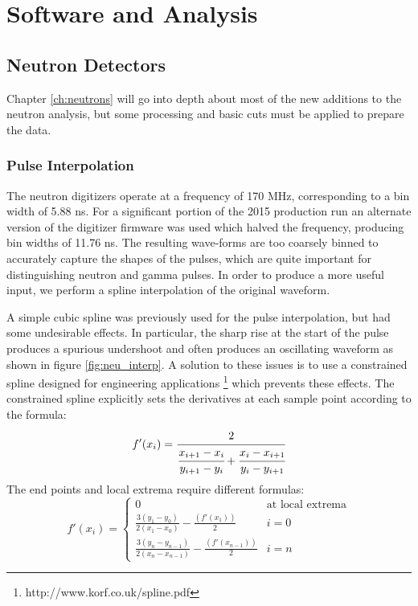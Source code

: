 \chapter{Software and Analysis} \label{ch:software}

\section{Neutron Detectors}

Chapter \ref{ch:neutrons} will go into depth about most of the new additions to the neutron analysis, but some processing and basic cuts must be applied to prepare the data.


\subsection{Pulse Interpolation}

The neutron digitizers operate at a frequency of 170 MHz, corresponding to a bin width of 5.88 ns.
For a significant portion of the 2015 production run an alternate version of the digitizer firmware was used which halved the frequency, producing bin widths of 11.76 ns.
The resulting wave-forms are too coarsely binned to accurately capture the shapes of the pulses, which are quite important for distinguishing neutron and gamma pulses.
In order to produce a more useful input, we perform a spline interpolation of the original waveform.

A simple cubic spline was previously used for the pulse interpolation, but had some undesirable effects.  
In particular, the sharp rise at the start of the pulse produces a spurious undershoot and often produces an oscillating waveform as shown in figure \ref{fig:neu_interp}.
A solution to these issues is to use a constrained spline designed for engineering applications \footnote{http://www.korf.co.uk/spline.pdf} which prevents these effects.
The constrained spline explicitly sets the derivatives at each sample point according to the formula:
\begin{equation}
f'(x_i) = \cfrac{2}{\cfrac{x_{i+1}-x_i}{y_{i+1}-y_i}+\cfrac{x_i-x_{i+1}}{y_i-y_{i+1}}}
\end{equation}
The end points and local extrema require different formulas:
\begin{equation}
f'(x_i) = \begin{cases} 
  0                                                                         & \text{at local extrema} \\
  \frac{3(y_1-y_0)}{2(x_1-x_0)}-\frac{(f'(x_1))}{2}                         & i=0                     \\
  \frac{3(y_n-y_{n-1})}{2(x_n-x_{n-1})}-\frac{(f'(x_{n-1}))}{2}             & i=n               
  \end{cases}
\end{equation}

